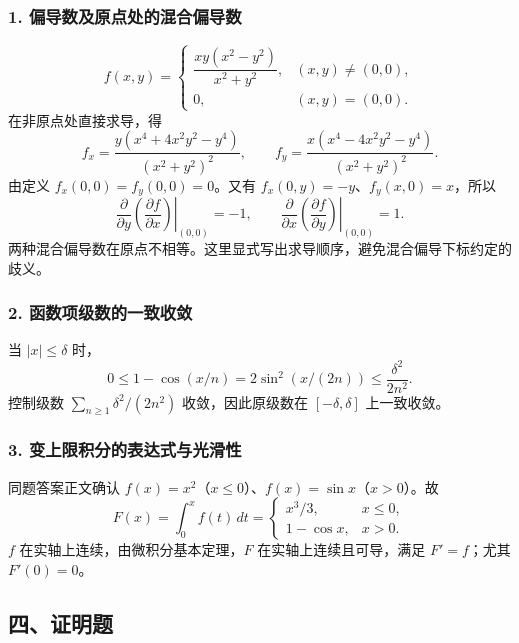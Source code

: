 \documentclass[11pt,fontset=fandol]{ctexart}
\begin{document}
\subsubsection{1.
偏导数及原点处的混合偏导数}\label{ux504fux5bfcux6570ux53caux539fux70b9ux5904ux7684ux6df7ux5408ux504fux5bfcux6570}

\[
f(x,y)=\begin{cases}\dfrac{xy(x^2-y^2)}{x^2+y^2},&(x,y)\neq(0,0),\\0,&(x,y)=(0,0).\end{cases}
\] 在非原点处直接求导，得 \[
f_x=\frac{y(x^4+4x^2y^2-y^4)}{(x^2+y^2)^2},\qquad
f_y=\frac{x(x^4-4x^2y^2-y^4)}{(x^2+y^2)^2}.
\] 由定义 \(f_x(0,0)=f_y(0,0)=0\)。又有
\(f_x(0,y)=-y\)、\(f_y(x,0)=x\)，所以 \[
\boxed{\left.\frac\partial{\partial y}\left(\frac{\partial f}{\partial x}\right)\right|_{(0,0)}=-1,\qquad
\left.\frac\partial{\partial x}\left(\frac{\partial f}{\partial y}\right)\right|_{(0,0)}=1.}
\]
两种混合偏导数在原点不相等。这里显式写出求导顺序，避免混合偏导下标约定的歧义。

\subsubsection{2.
函数项级数的一致收敛}\label{ux51fdux6570ux9879ux7ea7ux6570ux7684ux4e00ux81f4ux6536ux655b}

当 \(|x|\leq\delta\) 时， \[
0\leq1-\cos(x/n)=2\sin^2(x/(2n))\leq\frac{\delta^2}{2n^2}.
\] 控制级数 \(\sum_{n\geq1}\delta^2/(2n^2)\) 收敛，因此原级数在
\([-\delta,\delta]\) 上一致收敛。

\subsubsection{3.
变上限积分的表达式与光滑性}\label{ux53d8ux4e0aux9650ux79efux5206ux7684ux8868ux8fbeux5f0fux4e0eux5149ux6ed1ux6027}

同题答案正文确认
\(f(x)=x^2\)（\(x\leq0\)）、\(f(x)=\sin x\)（\(x>0\)）。故 \[
\boxed{F(x)=\int_0^xf(t)\,dt
=\begin{cases}x^3/3,&x\leq0,\\1-\cos x,&x>0.\end{cases}}
\] \(f\) 在实轴上连续，由微积分基本定理，\(F\) 在实轴上连续且可导，满足
\(F'=f\)；尤其 \(F'(0)=0\)。

\subsection{四、证明题}\label{ux56dbux8bc1ux660eux9898}
\end{document}
